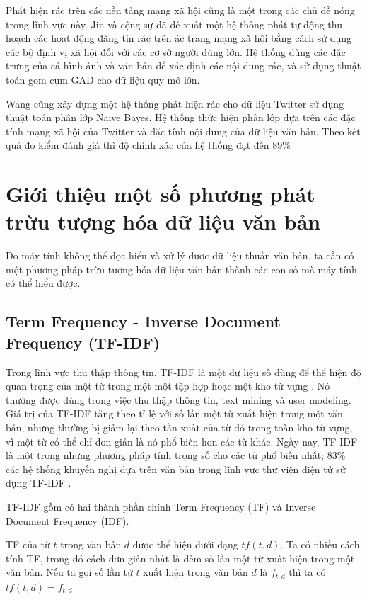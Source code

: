 Phát hiện rác trên các nền tảng mạng xã hội cũng là một trong các chủ đề nóng trong lĩnh vực này. Jin và cộng sự\cite{jin} đã đề xuất một hệ thống phát tự động thu hoạch các hoạt động đăng tin rác trên ác trang mạng xã hội bằng cách sử dụng các bộ định vị xã hội đối với các cơ sở người dùng lớn. Hệ thống dùng các đặc trưng của cả hình ảnh và văn bản để xác định các nội dung rác, và sử dụng thuật toán gom cụm GAD cho dữ liệu quy mô lớn.

Wang cũng xây dựng một hệ thống phát hiện rác cho dữ liệu Twitter sử dụng thuật toán phân lớp Naive Bayes. Hệ thống thức hiện phân lớp dựa trên các đặc tính mạng xã hội của Twitter và đặc tính nội dung của dữ liệu văn bản. Theo kết quả đo kiểm đánh giá thì độ chính xác của hệ thống đạt đến 89\%\cite{5741690}

\section{Giới thiệu một số phương phát trừu tượng hóa dữ liệu văn bản} \label{distances}
Do máy tính không thể đọc hiểu và xử lý được dữ liệu thuần văn bản, ta cần có một phương pháp trừu tượng hóa dữ liệu văn bản thành các con số mà máy tính có thể hiểu được.
\subsection*{Term Frequency - Inverse Document Frequency (TF-IDF)}
Trong lĩnh vực thu thập thông tin, TF-IDF là một dữ liệu số dùng để thể hiện độ quan trọng của một từ trong một một tập hợp hoạc một kho từ vựng \cite{rajaraman_ullman_2011}. Nó thường được dùng trong việc thu thập thông tin, text mining và user modeling. Giá trị của TF-IDF tăng theo tỉ lệ với số lần một từ xuất hiện trong một văn bản, nhưng thường bị giảm lại theo tần xuất của từ đó trong toàn kho từ vựng, vì một từ có thể chỉ đơn giản là nó phổ biến hơn các từ khác. Ngày nay, TF-IDF là một trong những phương pháp tính trọng số cho các từ phổ biến nhất; 83\% các hệ thống khuyến nghị dựa trên văn bản trong lĩnh vực thư viện điện tử sử dụng TF-IDF \cite{Beel2016}.

TF-IDF gồm có hai thành phần chính Term Frequency (TF) và Inverse Document Frequency (IDF).

TF của từ $t$ trong văn bản $d$ được thể hiện dưới dạng $tf(t,d)$. Ta có nhiều cách tính TF, trong đó cách đơn giản nhất là đếm số lần một từ xuất hiện trong một văn bản. Nếu ta gọi số lần từ $t$ xuất hiện trong văn bản $d$ là $f_{t,d}$ thì ta có $tf(t,d) = f_{t,d}$

